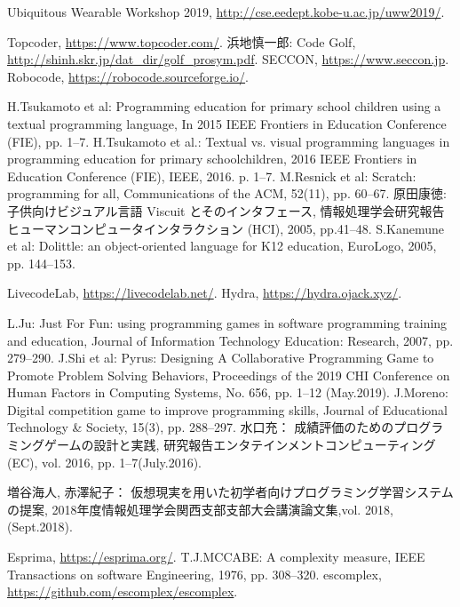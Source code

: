 \begin{thebibliography}{99}
	Ubiquitous Wearable Workshop 2019, \url{http://cse.eedept.kobe-u.ac.jp/uww2019/}.


	Topcoder, \url{https://www.topcoder.com/}.
	浜地慎一郎: Code Golf, \url{http://shinh.skr.jp/dat_dir/golf_prosym.pdf}.
	SECCON, \url{https://www.seccon.jp}.
	Robocode, \url{https://robocode.sourceforge.io/}.

	H.Tsukamoto et al: Programming education for primary school children using a textual programming language, In 2015 IEEE Frontiers in Education Conference (FIE), pp. 1--7.
	H.Tsukamoto et al.: Textual vs. visual programming languages in programming education for primary schoolchildren, 2016 IEEE Frontiers in Education Conference (FIE), IEEE, 2016. p. 1--7.
	M.Resnick et al: Scratch: programming for all, Communications of the ACM, 52(11), pp. 60--67.
	原田康徳: 子供向けビジュアル言語 Viscuit とそのインタフェース, 情報処理学会研究報告ヒューマンコンピュータインタラクション (HCI), 2005, pp.41--48.
	S.Kanemune et al: Dolittle: an object-oriented language for K12 education, EuroLogo, 2005, pp. 144--153.

	LivecodeLab, \url{https://livecodelab.net/}.
	Hydra, \url{https://hydra.ojack.xyz/}.

	L.Ju: Just For Fun: using programming games in software programming training and education, Journal of Information Technology Education: Research, 2007, pp. 279--290.
	J.Shi et al: Pyrus: Designing A Collaborative Programming Game to Promote Problem Solving Behaviors, Proceedings of the 2019 CHI Conference on Human Factors in Computing Systems, No. 656, pp. 1–12 (May.2019).
	J.Moreno: Digital competition game to improve programming skills, Journal of Educational Technology \& Society, 15(3), pp. 288--297.
	水口充： 成績評価のためのプログラミングゲームの設計と実践, 研究報告エンタテインメントコンピューティング(EC), vol. 2016, pp. 1–7(July.2016).

	増谷海人, 赤澤紀子： 仮想現実を用いた初学者向けプログラミング学習システムの提案, 2018年度情報処理学会関西支部支部大会講演論文集,vol. 2018, (Sept.2018).

	Esprima, \url{https://esprima.org/}.
	 T.J.MCCABE: A complexity measure, IEEE Transactions on software Engineering, 1976, pp. 308--320.
	escomplex, \url{https://github.com/escomplex/escomplex}.

\end{thebibliography}